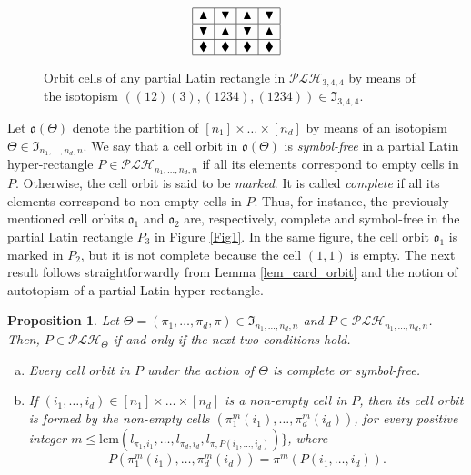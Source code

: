 \documentclass{article}
\newtheorem{prop}[thm]{Proposition}
\begin{document}
\begin{figure}[htbp]
$$\begin{array}{|c|c|c|c|}
\hline
\blacktriangle&\blacktriangledown&\blacktriangle & \blacktriangledown\\ \hline
\blacktriangledown &\blacktriangle&\blacktriangledown & \blacktriangle\\ \hline
\blacklozenge&\blacklozenge&\blacklozenge & \blacklozenge\\
\hline
\end{array}$$
\caption{Orbit cells of any partial Latin rectangle in $\mathcal{PLH}_{3,4,4}$ by means of the isotopism $((12)(3),(1234),(1234))\in \mathfrak{I}_{3,4,4}$.} \label{fig_orbits}
\end{figure}

Let $\mathfrak{o}(\Theta)$ denote the partition of $[n_1]\times\ldots\times [n_d]$ by means of an isotopism \mbox{$\Theta\in\mathfrak{I}_{n_1,\ldots,n_d,n}$}. We say that a cell orbit 
in 
$\mathfrak{o}(\Theta)$ is {\em symbol-free} in a partial Latin hyper-rectangle $P\in\mathcal{PLH}_{n_1,\ldots,n_d,n}$ if all its elements correspond to empty cells in $P$. Otherwise, 
the cell orbit is said to be 
{\em marked}. It is called {\em complete} if all its elements correspond to non-empty cells in $P$. Thus, for instance, the previously mentioned cell orbits $\mathfrak{o}_1$ and 
$\mathfrak{o}_2$ are, respectively, complete and symbol-free in the partial Latin rectangle $P_3$ in Figure \ref{Fig1}. In the same figure, the cell orbit $\mathfrak{o}_1$ is marked in $P_2$, but it is not complete because the cell $(1,1)$ is empty. The next result follows straightforwardly from Lemma \ref{lem_card_orbit} and the notion of autotopism of a partial Latin hyper-rectangle.

\begin{prop}\label{prop_PLH} Let $\Theta=(\pi_1,\ldots,\pi_d,\pi)\in \mathfrak{I}_{n_1,\ldots,n_d,n}$ and $P\in\mathcal{PLH}_{n_1,\ldots,n_d,n}$. Then, $P\in\mathcal{PLH}_{\Theta}$ if and only if the next two conditions hold.
\begin{enumerate}[a)]
\item Every cell orbit in $P$ under the action of $\Theta$ is complete or symbol-free.
\item If $(i_1,\ldots,i_d)\in [n_1]\times\ldots\times [n_d]$ is a non-empty cell in $P$, then its cell orbit is formed by the non-empty cells $(\pi^m_1(i_1),\ldots,\pi^m_d(i_d))$, for 
every positive integer $m\leq \mathrm{lcm}(l_{\pi_1,i_1},\ldots,l_{\pi_d,i_d},l_{\pi,P(i_1,\ldots,i_d)})\}$, where
\begin{equation}\label{basiceqauto}
P(\pi_1^m(i_1),\ldots,\pi_d^m(i_d))=\pi^m(P(i_1,\ldots,i_d)).
\end{equation}
\end{enumerate}
\end{prop}
\end{document}
